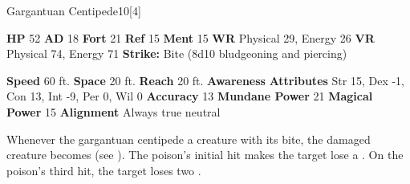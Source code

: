   \begin{monsubsection}{Gargantuan Centipede}{10}[4]
    \vspace{-1em}\vspace{-1em}
    \vspace{0em}

    
    

    \begin{spellcontent}
      \begin{spelltargetinginfo}
        \pari \textbf{HP} 52 \monsep
          \textbf{AD} 18 \monsep
          \textbf{Fort} 21 \monsep
          \textbf{Ref} 15 \monsep
          \textbf{Ment} 15
        \pari \textbf{WR} Physical 29, Energy 26 \monsep
        \textbf{VR} Physical 74, Energy 71
        \pari \textbf{Strike:}
            Bite  (8d10 bludgeoning and piercing)
      \end{spelltargetinginfo}
    \end{spellcontent}
    \begin{monsterfooter}
      \pari \textbf{Speed} 60 ft. \monsep
        \textbf{Space} 20 ft. \monsep
        \textbf{Reach} 20 ft.
      \pari \textbf{Awareness} 
      \pari \textbf{Attributes}
        Str 15, Dex -1,
        Con 13, Int -9,
        Per 0, Wil 0
      \pari \textbf{Accuracy} 13 \monsep
        \textbf{Mundane Power} 21 \monsep
      \textbf{Magical Power} 15
      \pari \textbf{Alignment} Always true neutral
    \end{monsterfooter}
  \end{monsubsection}
        Whenever the gargantuan centipede  a creature with its bite,
          the damaged creature becomes  (see ).
        The poison's initial hit makes the target lose a .
        On the poison's third hit, the target loses two .
  

